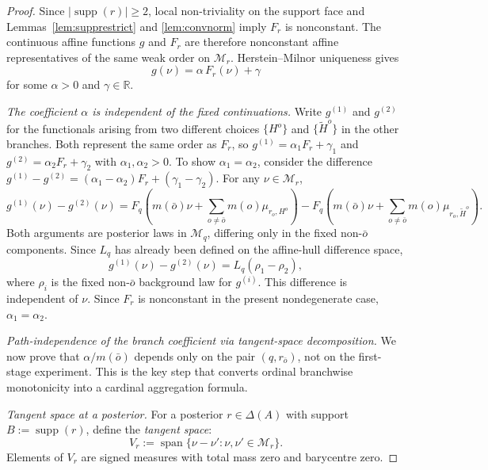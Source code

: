 \documentclass[11pt,a4paper]{article}
\theoremstyle{definition}
\newcommand{\R}{\mathbb R}
\newcommand{\1}{\mathbf 1}
\begin{document}
\begin{proof}
Since $|\operatorname{supp}(r)|\ge2$, local non-triviality on the support face and Lemmas~\ref{lem:supprestrict} and
\ref{lem:convnorm} imply $F_r$ is nonconstant.  The continuous affine functions $g$ and $F_r$ are therefore nonconstant
affine representatives of the same weak order on $\mathcal M_r$.  Herstein--Milnor uniqueness gives
\[
g(\nu)=\alpha\,F_r(\nu)+\gamma
\]
for some $\alpha>0$ and $\gamma\in\R$.

\emph{The coefficient $\alpha$ is independent of the fixed continuations.}  Write $g^{(1)}$ and $g^{(2)}$ for the
functionals arising from two different choices $\{H^o\}$ and $\{\widetilde H^o\}$ in the other branches.  Both
represent the same order as $F_r$, so $g^{(1)}=\alpha_1 F_r+\gamma_1$ and
$g^{(2)}=\alpha_2 F_r+\gamma_2$ with $\alpha_1,\alpha_2>0$.  To show $\alpha_1=\alpha_2$, consider the
difference $g^{(1)}-g^{(2)}=(\alpha_1-\alpha_2)F_r+(\gamma_1-\gamma_2)$.  For any
$\nu\in\mathcal M_r$,
\[
g^{(1)}(\nu)-g^{(2)}(\nu)
=
F_q\!\left(m(\bar o)\nu+\textstyle\sum_{o\ne\bar o}m(o)\mu_{r_o,H^o}\right)
-
F_q\!\left(m(\bar o)\nu+\textstyle\sum_{o\ne\bar o}m(o)\mu_{r_o,\widetilde H^o}\right).
\]
Both arguments are posterior laws in $\mathcal M_q$, differing only in the fixed non-$\bar o$ components.  Since $L_q$
has already been defined on the affine-hull difference space,
\[
g^{(1)}(\nu)-g^{(2)}(\nu)=L_q(\rho_1-\rho_2),
\]
where $\rho_i$ is the fixed non-$\bar o$ background law for $g^{(i)}$.  This difference is independent of $\nu$.  Since
$F_r$ is nonconstant in the present nondegenerate case, $\alpha_1=\alpha_2$.

\emph{Path-independence of the branch coefficient via tangent-space decomposition.}
We now prove that $\alpha/m(\bar o)$ depends only on the pair $(q,r_{\bar o})$, not on the first-stage experiment.
This is the key step that converts ordinal branchwise monotonicity into a cardinal aggregation formula.

\emph{Tangent space at a posterior.}  For a posterior $r\in\Delta(A)$ with support $B:=\operatorname{supp}(r)$, define
the \emph{tangent space}:
\[
V_r:=\operatorname{span}\{\nu-\nu':\nu,\nu'\in\mathcal M_r\}.
\]
Elements of $V_r$ are signed measures with total mass zero and barycentre zero.


\end{proof}
\end{document}
